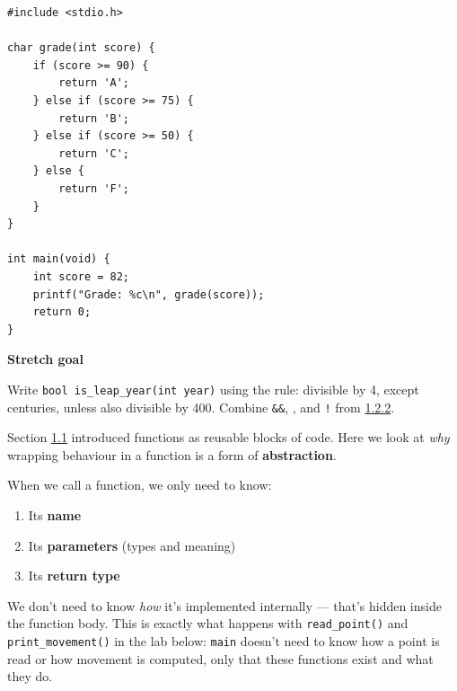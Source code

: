 \documentclass[11pt,a4paper]{article}
\providecommand{\tightlist}{\setlength{\itemsep}{0pt}\setlength{\parskip}{0pt}}
\begin{document}
\begin{lstlisting}[style=cscode]
#include <stdio.h>

char grade(int score) {
    if (score >= 90) {
        return 'A';
    } else if (score >= 75) {
        return 'B';
    } else if (score >= 50) {
        return 'C';
    } else {
        return 'F';
    }
}

int main(void) {
    int score = 82;
    printf("Grade: %c\n", grade(score));
    return 0;
}
\end{lstlisting}

\textbf{Stretch goal}

Write \texttt{bool\ is\_leap\_year(int\ year)} using the rule: divisible by 4, except centuries, unless also divisible by 400. Combine \texttt{\&\&}, \texttt{\textbar{}\textbar{}}, and \texttt{!} from \protect\hyperlink{122-comparison-and-logical-operators}{1.2.2}.

\label{l2-abstractions-structs-and-the-stack}
\hypertarget{l2-abstractions-structs-and-the-stack}{}

\label{21-abstraction-ii-functions}
\hypertarget{21-abstraction-ii-functions}{}

\label{211-abstraction-of-behavior-functions}
\hypertarget{211-abstraction-of-behavior-functions}{}

Section \protect\hyperlink{11-abstraction-i-functions}{1.1} introduced functions as reusable blocks of code. Here we look at \emph{why} wrapping behaviour in a function is a form of \textbf{abstraction}.

When we call a function, we only need to know:

\begin{enumerate}
\def\labelenumi{\arabic{enumi}.}
\tightlist
\item
  Its \textbf{name}
\item
  Its \textbf{parameters} (types and meaning)
\item
  Its \textbf{return type}
\end{enumerate}

We don't need to know \emph{how} it's implemented internally --- that's hidden inside the function body. This is exactly what happens with \texttt{read\_point()} and \texttt{print\_movement()} in the lab below: \texttt{main} doesn't need to know how a point is read or how movement is computed, only that these functions exist and what they do.
\end{document}

